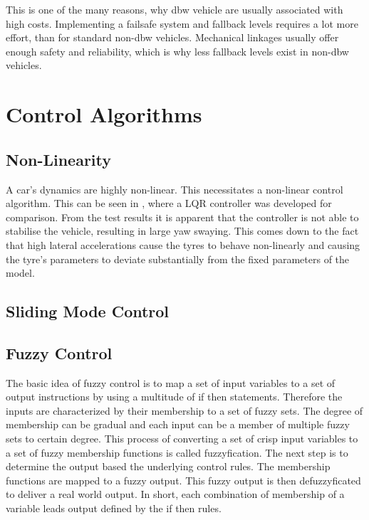 \documentclass[conference]{IEEEtran}
\begin{document}
This is one of the many reasons, why dbw vehicle are usually associated with high costs. Implementing a failsafe system and fallback levels requires a lot more effort, than for standard non-dbw vehicles. Mechanical linkages usually offer enough safety and reliability, which is why less fallback levels exist in non-dbw vehicles. 



\section{Control Algorithms}
\subsection{Non-Linearity}

A car's dynamics are highly non-linear. This necessitates a non-linear control algorithm. This can be seen in \cite{vandersande}, where a LQR controller was developed for comparison. From the test results it is apparent that the controller is not able to stabilise the vehicle, resulting in large yaw swaying. This comes down to the fact that high lateral accelerations cause the tyres to behave non-linearly and causing the tyre's parameters to deviate substantially from the fixed parameters of the model.


\subsection{Sliding Mode Control}

\subsection{Fuzzy Control}
The basic idea of fuzzy control is to map a set of input variables to a set of output instructions by using a multitude of if then statements. Therefore the inputs are characterized by their membership to a set of fuzzy sets. The degree of membership can be gradual and each input can be a member of multiple fuzzy sets to certain degree. This process of converting a set of crisp input variables to a set of fuzzy membership functions is called fuzzyfication. The next step is to determine the output based the underlying control rules. The membership functions are mapped to a fuzzy output. This fuzzy output is then defuzzyficated to deliver a real world output. In short, each combination of membership of a variable leads output defined by the if then rules.
\end{document}
